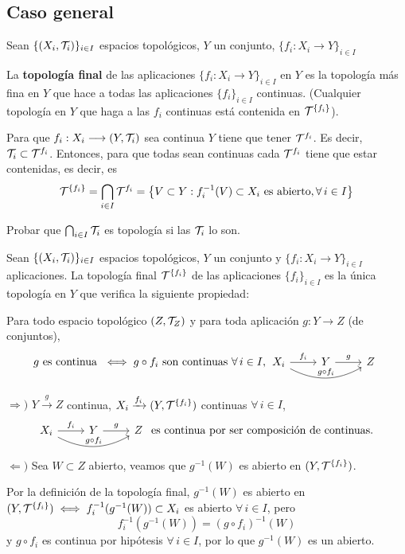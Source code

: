 \subsection{Caso general}
Sean $\{(X_i,\mathcal{T}_i)\}_{i \in I}$ espacios topol\'ogicos, $Y$ un conjunto, $\{f_i: X_i \longrightarrow Y\}_{i \in I}$
\begin{defi}
    La \textbf{topolog\'ia final} de las aplicaciones $\{f_i : X_i \longrightarrow Y\}_{i \in I}$ en $Y$ es la topolog\'ia m\'as fina en $Y$ que hace a todas las aplicaciones $\{f_i\}_{i \in I}$ continuas. (Cualquier topolog\'ia en $Y$ que haga a las $f_i$ continuas est\'a contenida en $\mathcal{T}^{\{f_i\}}$). 

    Para que $f_i: X_i \longrightarrow (Y, \mathcal{T}_i)$ sea continua $Y$ tiene que tener $\mathcal{T}^{f_i}$. Es decir, $\mathcal{T}_i \subset \mathcal{T}^{f_i}$. Entonces, para que todas sean continuas cada $\mathcal{T}^{f_i}$ tiene que estar contenidas, es decir, es
    $$\mathcal{T}^{\{f_i\}} = \bigcap_{i \in I} \mathcal{T}^{f_i} = \left\{ V \subset Y : f_i^{-1}(V) \subset X_i \text{ es abierto}, \forall \, i \in I \right\}$$
\end{defi}
\begin{ejer}
    Probar que $\bigcap_{i \in I} \mathcal{T}_i$ es topolog\'ia si las $\mathcal{T}_i$ lo son.
\end{ejer}
\begin{propi}
 Sean $\{(X_i,\mathcal{T}_i)\}_{i \in I}$ espacios topol\'ogicos, $Y$ un conjunto y $\{f_i : X_i \longrightarrow Y\}_{i \in I}$ aplicaciones. La topolog\'ia final $\mathcal{T}^{\{f_i\}}$ de las aplicaciones $\{f_i\}_{i \in I}$ es la \'unica topolog\'ia en $Y$ que verifica la siguiente propiedad:

Para todo espacio topol\'ogico $(Z, \mathcal{T}_Z)$ y para toda aplicaci\'on $g: Y \longrightarrow Z$ (de conjuntos),
$$g \text{ es continua } \iff  g\circ f_i \text{ son continuas } \forall \, i \in I, \bt X_i \arrow[bend right=10mm]{rr}{g\circ f_i} \rar{f_i} & Y \rar{g} & Z \et$$
\end{propi}
\begin{dem}
    $\Rightarrow)$ $Y \xrightarrow{g} Z$ continua, $X_i \xrightarrow{f_i} (Y, \mathcal{T}^{\{f_i\}})$ continuas $\forall \, i\in I$, 
    $$\bt X_i \rar{f_i} \arrow[bend right=10mm]{rr}{g\circ f_i}  & Y \rar{g} & Z \et \text{ es continua por ser composici\'on de continuas. }$$
    $\Leftarrow)$ Sea $W \subset Z$ abierto, veamos que $g^{-1}(W)$ es abierto en $ (Y, \mathcal{T}^{\{f_i\}})$.
    
    Por la definici\'on de la topolog\'ia final, $g^{-1}(W)$ es abierto en $ (Y, \mathcal{T}^{\{f_i\}}) \iff f_i^{-1}(g^{-1}(W)) \subset X_i$ es abierto $\forall \, i \in I$, pero 
    $$f_i^{-1}(g^{-1}(W)) = (g\circ f_i)^{-1}(W)$$
    y $g\circ f_i$ es continua por hip\'otesis $\forall \, i \in I$, por lo que $g^{-1}(W)$ es un abierto. 
\end{dem}
